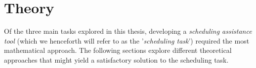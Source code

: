 \section{Theory}\label{sec:theory}
Of the three main tasks explored in this thesis, developing a \emph{scheduling assistance tool} (which we henceforth will refer to as the '\emph{scheduling task}') required the most mathematical approach. 
The following sections explore different theoretical approaches that might yield a satisfactory solution to the scheduling task.




